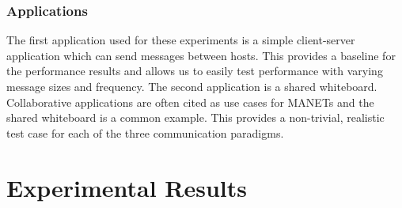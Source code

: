 \documentclass[lnicst]{svmultln}
\begin{document}




\subsubsection{Applications}

The first application used for these experiments is a simple client-server application which can send messages between hosts. This provides a baseline for the performance results and allows us to easily test performance with varying message sizes and frequency. The second application is a shared whiteboard. Collaborative applications are often cited as use cases for MANETs and the shared whiteboard is a common example\cite{wb1, wb2, wb3, wb4}. This provides a non-trivial, realistic test case for each of the three communication paradigms.


\section{Experimental Results}
\end{document}
